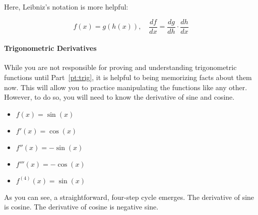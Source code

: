 Here, Leibniz's notation is more helpful:

$$f(x)=g(h(x)), \quad \frac{df}{dx}=\frac{dg}{dh}\cdot\frac{dh}{dx}$$

\paragraph{Trigonometric Derivatives}
While you are not responsible for proving and understanding trigonometric functions
until Part~\ref{pt:trig}, it is helpful to being memorizing facts about them now.  This will allow
you to practice manipulating the functions like any other.  However, to do so, you will
need to know the derivative of sine and cosine.

\begin{itemize}
\item $f(x) = \sin(x)$
\item $f'(x) = \cos(x)$
\item $f''(x) = -\sin(x)$
\item $f'''(x) = -\cos(x)$
\item $f^{(4)}(x) = \sin(x)$
\end{itemize}
As you can see, a straightforward, four-step cycle emerges.  The derivative of sine is
cosine.  The derivative of cosine is negative sine.


